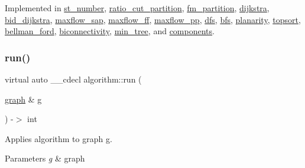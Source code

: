 Implemented in \mbox{\hyperlink{classst__number_ae6f86706b8ae3495d3794b8c684fff0f}{st\+\_\+number}}, \mbox{\hyperlink{classratio__cut__partition_aa8a67cb521749dc9c25322157563fb8e}{ratio\+\_\+cut\+\_\+partition}}, \mbox{\hyperlink{classfm__partition_a05ba0de86d7fe9c2de81b0681d8e0102}{fm\+\_\+partition}}, \mbox{\hyperlink{classdijkstra_a1b767b039cb69c422c5cc3247246e951}{dijkstra}}, \mbox{\hyperlink{classbid__dijkstra_ac7fa26bc76c1d3d0e0074fb01c66f72e}{bid\+\_\+dijkstra}}, \mbox{\hyperlink{classmaxflow__sap_a66cd0fdc3d4372c26c282129e9275894}{maxflow\+\_\+sap}}, \mbox{\hyperlink{classmaxflow__ff_ab9fcde7ee97a160c2be797d35c2a3204}{maxflow\+\_\+ff}}, \mbox{\hyperlink{classmaxflow__pp_a479e6e218f81d20acdc706b5771e38cb}{maxflow\+\_\+pp}}, \mbox{\hyperlink{classdfs_affaffda8be8418d6dbf396c5b1d6b81a}{dfs}}, \mbox{\hyperlink{classbfs_a9f93abba43ea1fa130a4c26b32793f2f}{bfs}}, \mbox{\hyperlink{classplanarity_aca500e3d46a99c6231aff86afa2a71b1}{planarity}}, \mbox{\hyperlink{classtopsort_af93d2f617ceae83ee2a4f9106fbc32c3}{topsort}}, \mbox{\hyperlink{classbellman__ford_a6aa4092aaa71b77d634749ded48068e9}{bellman\+\_\+ford}}, \mbox{\hyperlink{classbiconnectivity_a16d4b175efeff663004ae4cca6faa906}{biconnectivity}}, \mbox{\hyperlink{classmin__tree_a0edbe612424dc5f4de4701b8fd0df931}{min\+\_\+tree}}, and \mbox{\hyperlink{classcomponents_a07b6bab5962524ae26ccb478b35cd76c}{components}}.

\mbox{\label{classalgorithm_a482eb28cacba018b5a86d3a819a50a2f}} 
\subsubsection{\texorpdfstring{run()}{run()}}
{\footnotesize\ttfamily virtual auto \+\_\+\+\_\+cdecl algorithm\+::run (\begin{DoxyParamCaption}\item[{\mbox{\hyperlink{classgraph}{graph}} \&}]{g }\end{DoxyParamCaption}) -\/$>$  int\hspace{0.3cm}{\ttfamily [pure virtual]}}



Applies algorithm to graph g. 


\begin{DoxyParams}{Parameters}
{\em g} & graph \\
\hline
\end{DoxyParams}


